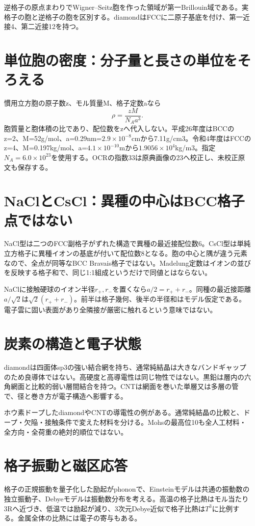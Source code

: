 逆格子の原点まわりでWigner--Seitz胞を作った領域が第一Brillouin域である。実格子の胞と逆格子の胞を区別する。diamondはFCCに二原子基底を付け、第一近接4、第二近接12を持つ。

\section{単位胞の密度：分子量と長さの単位をそろえる}\label{theory:atomic:density}
慣用立方胞の原子数z、モル質量M、格子定数aなら
\[
 \rho=\frac{zM}{N_Aa^3}.
\]
胞質量と胞体積の比であり、配位数をzへ代入しない。平成26年度はBCCのz=2、M=52g/mol、a=0.29nm=\(2.9\times10^{-8}\)cmから7.11g/cm3。令和4年度はFCCのz=4、M=0.197kg/mol、a=\(4.1\times10^{-10}\)mから\(1.9056\times10^4\)kg/m3。指定\(N_A=6.0\times10^{23}\)を使用する。OCRの指数33は原典画像の23へ校正し、未校正原文も保存する。

\section{NaClとCsCl：異種の中心はBCC格子点ではない}\label{theory:atomic:ionic}
NaCl型は二つのFCC副格子がずれた構造で異種の最近接配位数6。CsCl型は単純立方格子に異種イオンの基底が付いて配位数8となる。胞の中心と隅が違う元素なので、全点が同等なBCC Bravais格子ではない\cite{openstax_crystals}。Madelung定数はイオンの並びを反映する格子和で、同じ1:1組成というだけで同値とはならない。

NaClに接触硬球のイオン半径\(r_+,r_-\)を置くなら\(a/2=r_++r_-\)。同種の最近接距離\(a/\sqrt2\)は\(\sqrt2(r_++r_-)\)。前半は格子幾何、後半の半径和はモデル仮定である。電子雲に固い表面があり全隣接が厳密に触れるという意味ではない。

\section{炭素の構造と電子状態}\label{theory:atomic:carbon}
diamondは四面体sp3の強い結合網を持ち、通常純結晶は大きなバンドギャップのため良導体ではない\cite{atomic_diamond}。高硬度と高導電性は同じ物性ではない。黒鉛は層内の六角網面と比較的弱い層間結合を持つ。CNTは網面を巻いた単層又は多層の管で、径と巻き方が電子構造へ影響する\cite{atomic_cnt}。

ホウ素ドープしたdiamondやCNTの導電性の例がある\cite{atomic_cnt}。通常純結晶の比較と、ドープ・欠陥・接触条件で変えた材料を分ける。Mohsの最高位10も全人工材料・全方向・全荷重の絶対的順位ではない。

\section{格子振動と磁区応答}\label{theory:atomic:phonon}
格子の正規振動を量子化した励起がphononで、Einsteinモデルは共通の振動数の独立振動子、Debyeモデルは振動数分布を考える。高温の格子比熱はモル当たり3Rへ近づき、低温では励起が減り、3次元Debye近似で格子比熱は\(T^3\)に比例する\cite{atomic_phonon}。金属全体の比熱には電子の寄与もある。

